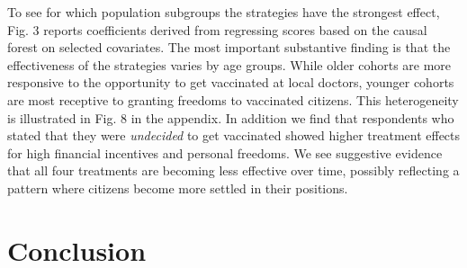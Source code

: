 \documentclass[12pt]{article}
\renewcommand\hl[1]{#1}
\begin{document}
\hl{To see for which population subgroups the strategies have the strongest effect,  Fig. 3 reports coefficients derived from regressing scores based on the causal forest on selected covariates. The most important substantive finding is that the effectiveness of the strategies varies by age groups. While older cohorts are more responsive to the opportunity to get vaccinated at local doctors, younger cohorts are most receptive to granting freedoms to vaccinated citizens. This heterogeneity is illustrated in Fig. 8 in the appendix. In addition we find that respondents who stated that they were \textit{undecided} to get vaccinated showed higher treatment effects for high financial incentives and personal freedoms.  We see suggestive evidence that all four treatments are becoming less effective over time, possibly reflecting a pattern where citizens become more settled in their positions.}




\section*{Conclusion}
\end{document}
